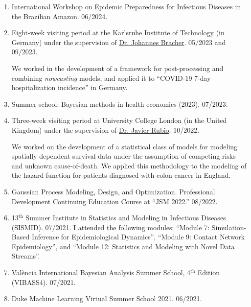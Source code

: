 \documentclass[10pt, ]{article}
\begin{document}
	\begin{enumerate}[noitemsep, topsep=0pt]
		\item International Workshop on Epidemic Preparedness for Infectious Diseases in the Brazilian Amazon. 06/2024.
		
		\item Eight-week visiting period at the Karlsruhe Institute of Technology (in Germany) under the supervision of \href{https://jbracher.github.io/}{Dr. Johannes Bracher}. 05/2023 and 09/2023.\vspace{3pt}
		
		We worked in the development of a framework for post-processing and combining \textit{nowcasting} models, and applied it to ``COVID-19 7-day hospitalization incidence'' in Germany.\vspace{3pt}
		
		\item Summer school: Bayesian methods in health economics (2023).  07/2023.
		
		\item Three-week visiting period at University College London (in the United Kingdom) under the supervision of \href{https://sites.google.com/site/fjavierrubio67/}{Dr. Javier Rubio}. 10/2022.\vspace{3pt}
		
		We worked on the development of a statistical class of models for modeling spatially dependent survival data under the assumption of competing risks and unknown cause-of-death. We applied this methodology to the modeling of the hazard function for patients diagnosed with colon cancer in England.\vspace{3pt}
		
		
		\item Gaussian Process Modeling, Design, and Optimization. Professional Development Continuing Education Course at ``JSM 2022.'' 08/2022.
		
		\item 13${}^{\text{th}}$ Summer Institute in Statistics and Modeling in Infectious Diseases (SISMID). 07/2021. I attended the following modules: ``Module 7: Simulation-Based Inference for Epidemiological Dynamics'', ``Module 9: Contact Network Epidemiology'', and ``Module 12: Statistics and Modeling with Novel Data Streams''.
		
		\item València International Bayesian Analysis Summer School, 4${}^{\text{th}}$ Edition (VIBASS4). 07/2021.
		
		\item Duke Machine Learning Virtual Summer School 2021. 06/2021.
	\end{enumerate}
	
\end{document}
